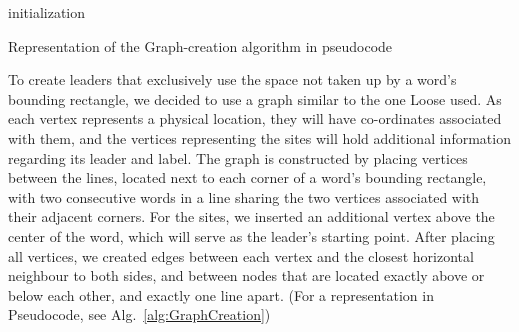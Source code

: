 \documentclass[11pt,a4paper]{vutinfth}
\begin{document}
\begin{algorithm}%
\DontPrintSemicolon
{}
    



 initialization\;
 
\caption{Representation of the Graph-creation algorithm in pseudocode}
\label{alg:GraphCreation}
\end{algorithm}
To create leaders that exclusively use the space not taken up by a word's bounding rectangle, we decided to use a graph similar to the one Loose \cite{Loose2015} used.
As each vertex represents a physical location, they will have co-ordinates associated with them, and the vertices representing the sites will hold additional information regarding its leader and label. 
The graph is constructed by placing vertices between the lines, located next to each corner of a word's bounding rectangle, with two consecutive words in a line sharing the two vertices associated with their adjacent corners. 
For the sites, we inserted an additional vertex above the center of the word, which will serve as the leader's starting point. After placing all vertices, we created edges between each vertex and the closest horizontal neighbour to both sides, and between nodes that are located exactly above or below each other, and exactly one line apart. (For a representation in Pseudocode, see Alg.~\ref{alg:GraphCreation})
\end{document}
